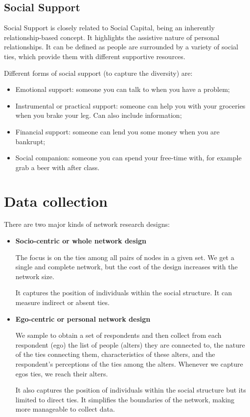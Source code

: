 \documentclass[
  notitlepage,
  onecolumn,
  openany]{book}
\providecommand{\tightlist}{%
  \setlength{\itemsep}{0pt}\setlength{\parskip}{0pt}}
\begin{document}
\hypertarget{social-support}{%
\subsection{Social Support}\label{social-support}}

Social Support is closely related to Social Capital, being an inherently relationship-based concept. It highlights the assistive nature of personal relationships. It can be defined as people are surrounded by a variety of social ties, which provide them with different supportive resources.

Different forms of social support (to capture the diversity) are:

\begin{itemize}
\tightlist
\item
  Emotional support: someone you can talk to when you have a problem;
\item
  Instrumental or practical support: someone can help you with your groceries when you brake your leg. Can also include information;
\item
  Financial support: someone can lend you some money when you are bankrupt;
\item
  Social companion: someone you can spend your free-time with, for example grab a beer with after class.
\end{itemize}

\hypertarget{data-collection}{%
\section{Data collection}\label{data-collection}}

There are two major kinds of network research designs:

\begin{itemize}
\item
  \textbf{Socio-centric or whole network design}

  The focus is on the ties among all pairs of nodes in a given set. We get a single and complete network, but the cost of the design increases with the network size.

  It captures the position of individuals within the social structure. It can measure indirect or absent ties.
\item
  \textbf{Ego-centric or personal network design}

  We sample to obtain a set of respondents and then collect from each respondent (ego) the list of people (alters) they are connected to, the nature of the ties connecting them, characteristics of these alters, and the respondent's perceptions of the ties among the alters. Whenever we capture egos ties, we reach their alters.

  It also captures the position of individuals within the social structure but its limited to direct ties. It simplifies the boundaries of the network, making more manageable to collect data.
\end{itemize}
\end{document}
